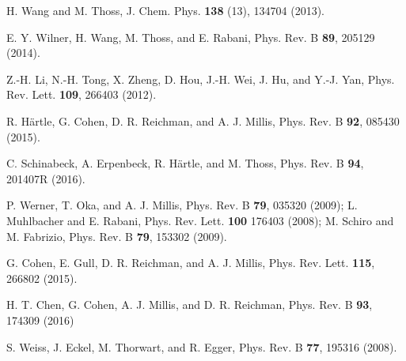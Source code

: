 \documentclass[aps,pra,twocolumn,groupedaddress,showpacs,superscriptaddress,amssymb,amsmath]{revtex4-1}
\begin{document}
\begin{thebibliography}{0}
H. Wang and M. Thoss,
J. Chem. Phys. {\bf 138} (13), 134704 (2013).
%

E. Y. Wilner, H. Wang, M. Thoss, and E. Rabani,
Phys. Rev. B {\bf 89}, 205129 (2014).


Z.-H. Li, N.-H. Tong, X. Zheng, D. Hou, J.-H. Wei, J. Hu, and Y.-J. Yan,
Phys. Rev. Lett. {\bf 109}, 266403  (2012).


R. H\"artle, G. Cohen, D. R. Reichman, and A. J. Millis,
Phys. Rev. B {\bf 92}, 085430 (2015).

C. Schinabeck, A. Erpenbeck, R. H\"artle, and M. Thoss,
Phys. Rev. B {\bf 94}, 201407R (2016).

P. Werner, T. Oka, and A. J. Millis, Phys. Rev. B {\bf 79}, 035320 (2009);
L. Muhlbacher and E. Rabani, Phys. Rev. Lett. {\bf 100} 176403 (2008);
M. Schiro and M. Fabrizio, Phys. Rev. B {\bf 79}, 153302 (2009).


G. Cohen, E. Gull, D. R. Reichman, and A. J. Millis, 
Phys. Rev. Lett. {\bf 115}, 266802 (2015).


H. T. Chen, G. Cohen, A. J. Millis, and D. R. Reichman, 
Phys. Rev. B {\bf 93}, 174309 (2016)


S. Weiss, J. Eckel, M. Thorwart, and R. Egger,
Phys. Rev. B {\bf 77}, 195316 (2008).


\end{thebibliography}
\end{document}
